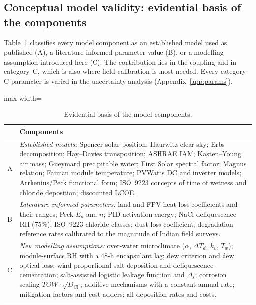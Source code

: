 \documentclass[preprint,11pt]{elsarticle}
\newcommand{\TOWsym}{\mathit{TOW}}
\begin{document}
\subsection{Conceptual model validity: evidential basis of the components}
Table~\ref{tab:evidence} classifies every model component as an established model used as published (A), a
literature-informed parameter value (B), or a modelling assumption introduced here (C). The contribution lies in the
coupling and in category~C, which is also where field calibration is most needed. Every category-C parameter is varied
in the uncertainty analysis (Appendix~\ref{app:params}).

\begin{table}[!t]
\caption{Evidential basis of the model components.}
\label{tab:evidence}
\centering
\footnotesize
\begin{adjustbox}{max width=\textwidth}
\begin{tabular}{@{}p{6mm}p{124mm}@{}}
\toprule
 & Components \\
\midrule
A & \emph{Established models:} Spencer solar position; Haurwitz clear sky; Erbs decomposition; Hay--Davies
transposition; ASHRAE IAM; Kasten--Young air mass; Gueymard precipitable water; First Solar spectral factor; Magnus
relation; Faiman module temperature; PVWatts DC and inverter models; Arrhenius/Peck functional form; ISO~9223 concepts
of time of wetness and chloride deposition; discounted LCOE. \\
B & \emph{Literature-informed parameters:} land and FPV heat-loss coefficients and their ranges; Peck $E_a$ and $n$;
PID activation energy; NaCl deliquescence RH (75\%); ISO~9223 chloride classes; dust loss coefficient; degradation
reference rates calibrated to the magnitude of Indian field surveys. \\
C & \emph{New modelling assumptions:} over-water microclimate ($\alpha$, $\Delta T_d$, $k_v$, $T_w$); module-surface RH
with a 48-h encapsulant lag; dew criterion and dew optical loss; wind-proportional salt deposition and deliquescence
cementation; salt-assisted logistic leakage function and $\Delta_s$; corrosion scaling $\TOWsym\cdot\sqrt{D_{\mathrm{Cl}}}$;
additive mechanisms with a constant annual rate; mitigation factors and cost adders; all deposition rates and costs. \\
\bottomrule
\end{tabular}
\end{adjustbox}
\end{table}
\end{document}
